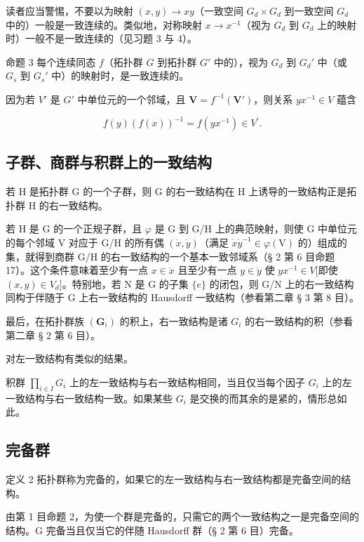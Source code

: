 读者应当警惕，不要以为映射 \((x, y) \to xy\)（一致空间 \(G_{d} \times G_{d}\) 到一致空间 \(G_{d}\) 中的）一般是一致连续的。类似地，对称映射 \(x \to x^{-1}\)（视为 \(G_{d}\) 到 \(G_{d}\) 上的映射时）一般不是一致连续的（见习题 3 与 4）。

命题 3 每个连续同态 \(f\)（拓扑群 \(G\) 到拓扑群 \(G'\) 中的），视为 \(G_d\) 到 \(G_d'\) 中（或 \(G_s\) 到 \(G_s'\) 中）的映射时，是一致连续的。

因为若 \(V'\) 是 \(G'\) 中单位元的一个邻域，且 \(\mathbf{V} = f^{-1}(\mathbf{V}')\)，则关系 \(yx^{-1} \in V\) 蕴含

\[
f (y) (f (x)) ^ {- 1} = f (y x ^ {- 1}) \in V ^ {\prime}.
\]

\subsection{子群、商群与积群上的一致结构}

若 H 是拓扑群 G 的一个子群，则 G 的右一致结构在 H 上诱导的一致结构正是拓扑群 H 的右一致结构。

若 H 是 G 的一个正规子群，且 \(\varphi\) 是 G 到 G/H 上的典范映射，则使 G 中单位元的每个邻域 V 对应于 G/H 的所有偶 \((\dot{x},\dot{y})\)（满足 \(\dot{x}\dot{y}^{-1}\in \varphi (\mathrm{V})\) 的）组成的集，就得到商群 G/H 的右一致结构的一个基本一致邻域系（§ 2 第 6 目命题 17）。这个条件意味着至少有一点 \(x\in \dot{x}\) 且至少有一点 \(y\in \dot{y}\) 使 \(yx^{-1}\in V\){[}即使 \((x,y)\in V_d]\)。特别地，若 N 是 G 的子集 \(\{e\}\) 的闭包，则 G/N 上的右一致结构同构于伴随于 G 上右一致结构的 Hausdorff 一致结构（参看第二章 § 3 第 8 目）。

最后，在拓扑群族 \((\mathbf{G}_{i})\) 的积上，右一致结构是诸 \(G_{i}\) 的右一致结构的积（参看第二章 § 2 第 6 目）。

对左一致结构有类似的结果。

积群 \(\prod_{i\in I}G_i\) 上的左一致结构与右一致结构相同，当且仅当每个因子 \(G_{i}\) 上的左一致结构与右一致结构一致。如果某些 \(G_{i}\) 是交换的而其余的是紧的，情形总如此。

\subsection{完备群}

定义 2 拓扑群称为完备的，如果它的左一致结构与右一致结构都是完备空间的结构。

由第 1 目命题 2，为使一个群是完备的，只需它的两个一致结构之一是完备空间的结构。G 完备当且仅当它的伴随 Hausdorff 群（§ 2 第 6 目）完备。

